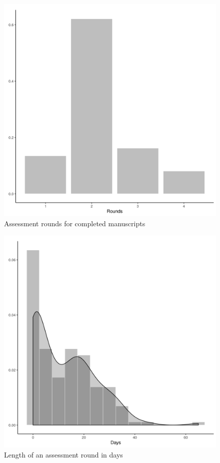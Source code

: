 \documentclass[PP]{AEA}
\begin{document}
\begin{figure}
    \centering
    \includegraphics[height=0.4\textheight]{images/n_rounds_plot.png}
    \caption{Assessment rounds for completed manuscripts}
    \label{fig:pre:rounds}
\end{figure}

\begin{figure}
    \centering
    \includegraphics[height=0.4\textheight]{images/revision_round_length_hist.png}
    \caption{Length of an assessment round in days}
    \label{fig:pre:round_length}
\end{figure}
\end{document}

